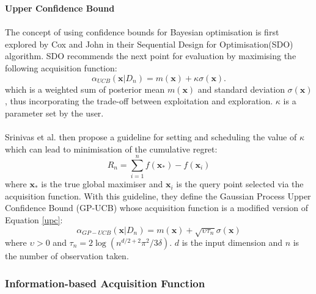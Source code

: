 \documentclass[a4paper,11pt]{report}
\begin{document}
\textbf{Upper Confidence Bound}
\\\\
The concept of using confidence bounds for Bayesian optimisation is first explored by Cox and John \cite{cox1992statistical} in their Sequential Design for Optimisation(SDO) algorithm. SDO recommends the next point for evaluation by maximising the following acquisition function: 
\begin{equation} \label{upc}
	\alpha_{UCB}(\mathbf{x} \vert D_n) = m(\mathbf{x}) + \kappa \sigma(\mathbf{x}).
\end{equation} 
which is a weighted sum of posterior mean $m(\mathbf{x})$ and standard deviation $\sigma(\mathbf{x})$, thus incorporating the trade-off between exploitation and exploration. $\kappa$ is a parameter set by the user.
\\\\
Srinivas et al. \cite{srinivas2009gaussian} then propose a guideline for setting and scheduling the value of $\kappa$ which can lead to minimisation of the cumulative regret:  
\begin{equation}
	R_{n} = \sum_{i=1}^n f(\mathbf{x}_{*}) - f(\mathbf{x}_{i})
\end{equation}
where $\mathbf{x}_{*} $ is the true global maximiser and $\mathbf{x}_i$ is the query point selected via the acquisition function. With this guideline, they define the Gaussian Process Upper Confidence Bound (GP-UCB) whose acquisition function is a modified version of Equation \ref{upc}: 
\begin{equation} \label{gp-upc}
	\alpha_{GP-UCB}(\mathbf{x} \vert D_n) = m(\mathbf{x}) + \sqrt{\upsilon \tau_{n}} \sigma(\mathbf{x})
\end{equation} 
where $\upsilon>0$ and $\tau_n=2 \log(n^{d/2+2}\pi^2 / 3\delta)$. $d$ is the input dimension and $n$ is the number of observation taken.
\subsubsection{Information-based Acquisition Function} \label{Infoaf}
\end{document}
